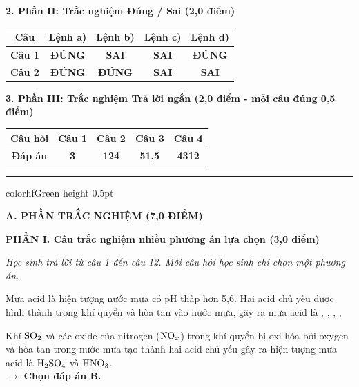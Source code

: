 \documentclass[11pt,a4paper]{article}
\begin{document}
\vspace{2pt}
\noindent
\textbf{\color{mainGreen}2. Phần II: Trắc nghiệm Đúng / Sai (2,0 điểm)}
\begin{center}
\renewcommand{\arraystretch}{1.2}
\begin{tabular}{|c|c|c|c|c|}
\hline
\rowcolor{tableGreen}
\textbf{Câu} & \textbf{Lệnh a)} & \textbf{Lệnh b)} & \textbf{Lệnh c)} & \textbf{Lệnh d)} \\
\hline
\textbf{Câu 1} & \textbf{\color{hfRed}ĐÚNG} & \textbf{\color{solBlue}SAI} & \textbf{\color{solBlue}SAI} & \textbf{\color{hfRed}ĐÚNG} \\
\hline
\textbf{Câu 2} & \textbf{\color{hfRed}ĐÚNG} & \textbf{\color{hfRed}ĐÚNG} & \textbf{\color{solBlue}SAI} & \textbf{\color{solBlue}SAI} \\
\hline
\end{tabular}
\end{center}

\vspace{2pt}
\noindent
\textbf{\color{mainGreen}3. Phần III: Trắc nghiệm Trả lời ngắn (2,0 điểm - mỗi câu đúng 0,5 điểm)}
\begin{center}
\renewcommand{\arraystretch}{1.2}
\begin{tabular}{|c|c|c|c|c|}
\hline
\rowcolor{tableGreen}
\textbf{Câu hỏi} & \textbf{Câu 1} & \textbf{Câu 2} & \textbf{Câu 3} & \textbf{Câu 4} \\
\hline
\textbf{Đáp án} & \textbf{\color{hfRed}3} & \textbf{\color{hfRed}124} & \textbf{\color{hfRed}51,5} & \textbf{\color{hfRed}4312} \\
\hline
\end{tabular}
\end{center}

\vspace{4pt}
\hrule color{hfGreen} height 0.5pt


\vspace{4pt}
\noindent
\textbf{\large\color{hfRed}A. PHẦN TRẮC NGHIỆM (7,0 ĐIỂM)}

\vspace{2pt}
\noindent
\textbf{\large\color{mainGreen}PHẦN I. Câu trắc nghiệm nhiều phương án lựa chọn (3,0 điểm)}

\textit{Học sinh trả lời từ câu 1 đến câu 12. Mỗi câu hỏi học sinh chỉ chọn một phương án.}
\vspace{4pt}


\begin{ex}%
Mưa acid là hiện tượng nước mưa có pH thấp hơn 5,6. Hai acid chủ yếu được hình thành trong khí quyển và hòa tan vào nước mưa, gây ra mưa acid là
\choice
{, }
{\True {}, }
{, }
{, }
\begin{loigiai}
Khí $\ce{SO2}$ và các oxide của nitrogen ($\ce{NO_x}$) trong khí quyển bị oxi hóa bởi oxygen và hòa tan trong nước mưa tạo thành hai acid chủ yếu gây ra hiện tượng mưa acid là $\ce{H2SO4}$ và $\ce{HNO3}$.\\
$\rightarrow$ \textbf{Chọn đáp án B.}
\end{loigiai}
\end{ex}
\end{document}
